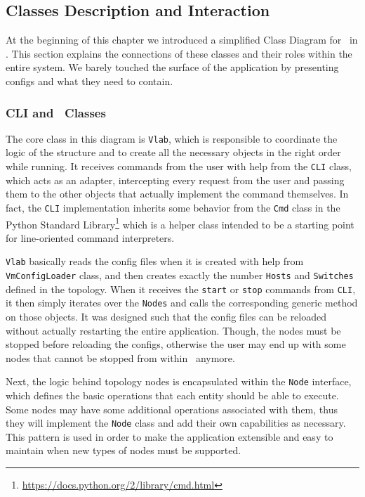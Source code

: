 \subsection{Classes Description and Interaction}
\label{sub-sec:classes-description-interaction}

At the beginning of this chapter we introduced a simplified Class Diagram for \project\ in .
This section explains the connections of these classes and their roles within the entire system.
We barely touched the surface of the application by presenting configs and what they need to contain.

\subsubsection{CLI and \project\ Classes}
\label{sub-sub-sec:cli-vlab-classes}

The core class in this diagram is \texttt{Vlab}, which is responsible to coordinate the logic of the structure and to create all the necessary objects in the right order while running.
It receives commands from the user with help from the \texttt{CLI} class, which acts as an adapter, intercepting every request from the user and passing them to the other objects that actually implement the command themselves.
In fact, the \texttt{CLI} implementation inherits some behavior from the \texttt{Cmd} class in the Python Standard Library\footnote{\url{https://docs.python.org/2/library/cmd.html}} which is a helper class intended to be a starting point for line-oriented command interpreters.

\texttt{Vlab} basically reads the config files when it is created with help from \texttt{VmConfigLoader} class, and then creates exactly the number \texttt{Hosts} and \texttt{Switches} defined in the topology.
When it receives the \texttt{start} or \texttt{stop} commands from \texttt{CLI}, it then simply iterates over the \texttt{Nodes} and calls the corresponding generic method on those objects.
It was designed such that the config files can be reloaded without actually restarting the entire application.
Though, the nodes must be stopped before reloading the configs, otherwise the user may end up with some nodes that cannot be stopped from within \project\ anymore.

Next, the logic behind topology nodes is encapsulated within the \texttt{Node} interface, which defines the basic operations that each entity should be able to execute.
Some nodes may have some additional operations associated with them, thus they will implement the \texttt{Node} class and add their own capabilities as necessary.
This pattern is used in order to make the application extensible and easy to maintain when new types of nodes must be supported.

